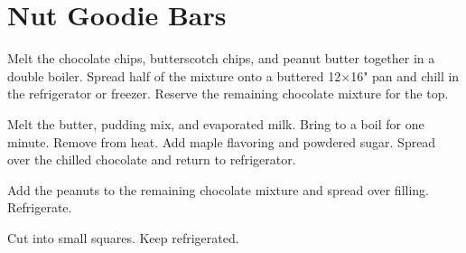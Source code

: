 \section{Nut Goodie Bars}
\begin{recipe}



	Melt the chocolate chips, butterscotch chips, and peanut butter together in a double boiler. Spread half of the mixture onto a buttered 12$\times$16" pan and chill in the refrigerator or freezer. Reserve the remaining chocolate mixture for the top.

	Melt the butter, pudding mix, and evaporated milk. Bring to a boil for one minute. Remove from heat. Add maple flavoring and powdered sugar. Spread over the chilled chocolate and return to refrigerator.

	Add the peanuts to the remaining chocolate mixture and spread over filling. Refrigerate.

	Cut into small squares. Keep refrigerated.



\end{recipe}
